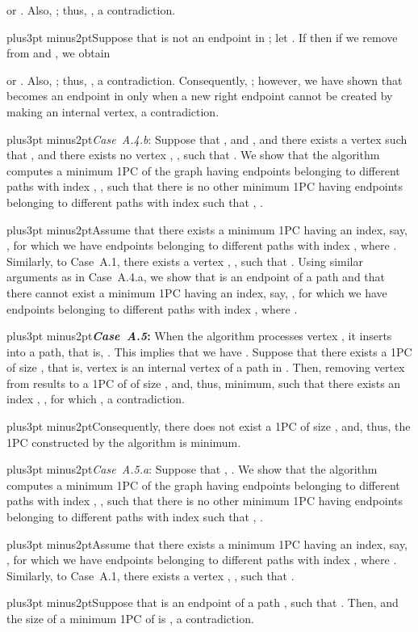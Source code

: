 \documentclass[10pt]{article}
\def\yskip{\penalty-50\vskip3pt plus3pt minus2pt}
\def\y{\yskip}
\begin{document}
{or
.
Also, ; thus,
, a
contradiction.

\y Suppose that  is not an endpoint in
; let . If  then if we remove
 from  and
, we obtain

or
.
Also, ; thus,
, a
contradiction. Consequently, ; however,
we have shown that  becomes an endpoint in
 only when a new right endpoint
cannot be created by making  an internal vertex, a
contradiction.


\y \textit{Case~A.4.b}: Suppose that ,  and
,  and there exists a vertex  such that
, 
and there exists no vertex , , such that
. We show that
the algorithm computes a minimum 1PC
 of the graph  having
 endpoints  belonging to different
paths with index , , such that
there is no other minimum 1PC 
having  endpoints  belonging to
different paths with index  such that
, .

\y Assume that there exists a minimum 1PC
 having an index, say, , for
which we have  endpoints 
belonging to different paths with index ,
where .
Similarly, to Case~A.1, there exists a vertex , , such that .
Using similar arguments as in Case~A.4.a, we show that  is an
endpoint of a path  and that there cannot exist a
minimum 1PC  having an index, say,
, for which we have  endpoints
 belonging to different paths with index , where
.



\y {\bf \textit{Case~A.5}:} When the algorithm processes vertex
, it inserts  into a path, that is,
. This implies
that  we have .
Suppose that there exists a 1PC  of
size , that is, vertex  is an
internal vertex of a path  in .
Then, removing vertex  from 
results to a 1PC of  of size ,
and, thus, minimum, such that there exists an index , , for which , a contradiction.

\y Consequently, there does not exist a 1PC
 of size
, and, thus, the 1PC constructed by
the algorithm is minimum.

\y \textit{Case~A.5.a}: Suppose that , . We show that the
algorithm computes a minimum 1PC  of
the graph  having  endpoints 
belonging to different paths with index , , such that there is no other minimum 1PC
 having 
endpoints  belonging to different paths with index
 such that
, .

\y Assume that there exists a minimum 1PC
 having an index, say, , for
which we have  endpoints 
belonging to different paths with index ,
where .
Similarly, to Case~A.1, there exists a vertex , , such that .

\y Suppose that  is an endpoint of a path , such that .
Then,  and the size of a minimum 1PC of
 is , a contradiction.

}
\end{document}
